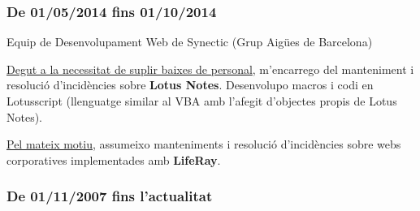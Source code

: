 \documentclass[11pt]{article}
\begin{document}
\subsubsection{De 01/05/2014 fins 01/10/2014}
\label{sec-5-1-2}

Equip de Desenvolupament Web de Synectic (Grup Aigües de Barcelona)

\underline{Degut a la necessitat de suplir baixes de personal}, m'encarrego del manteniment i resolució d'incidències sobre \textbf{Lotus Notes}. Desenvolupo macros i codi en Lotusscript (llenguatge similar al VBA amb l'afegit d'objectes propis de Lotus Notes). 

\underline{Pel mateix motiu}, assumeixo manteniments i resolució d'incidències sobre webs corporatives implementades amb \textbf{LifeRay}.
\subsubsection{De 01/11/2007 fins l’actualitat}
\label{sec-5-1-3}
\end{document}
